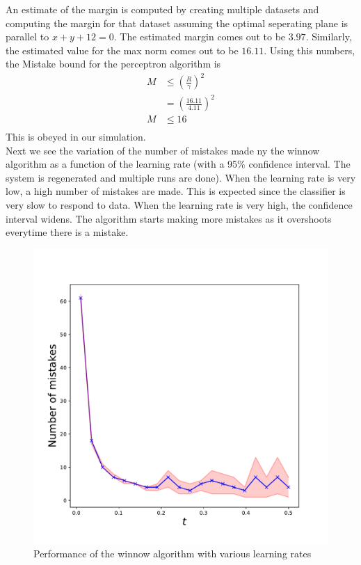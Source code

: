 \documentclass{article}
\begin{document}
An estimate of the margin is computed by creating multiple datasets and computing the margin for that dataset assuming the optimal seperating plane is parallel to $x+y+12=0$. The estimated margin comes out to be $3.97$. Similarly, the estimated value for the max norm comes out to be $16.11$. Using this numbers, the Mistake bound for the perceptron algorithm is
\begin{align*}
    M &\leq \left(\frac{R}{\gamma}\right)^2\\
    &=\left(\frac{16.11}{4.11}\right)^2\\
    M &\leq 16\\
\end{align*}
This is obeyed in our simulation.\\

Next we see the variation of the number of mistakes made ny the winnow algorithm as a function of the learning rate (with a 95\% confidence interval. The system is regenerated and multiple runs are done). When the learning rate is very low, a high number of mistakes are made. This is expected since the classifier is very slow to respond to data. When the learning rate is very high, the confidence interval widens. The algorithm starts making more mistakes as it overshoots everytime there is a mistake.
\begin{figure}[h!]
\centering
\includegraphics[scale=0.4]{q6b}
\caption{Performance of the winnow algorithm with various learning rates}
\end{figure}
\clearpage
\end{document}
